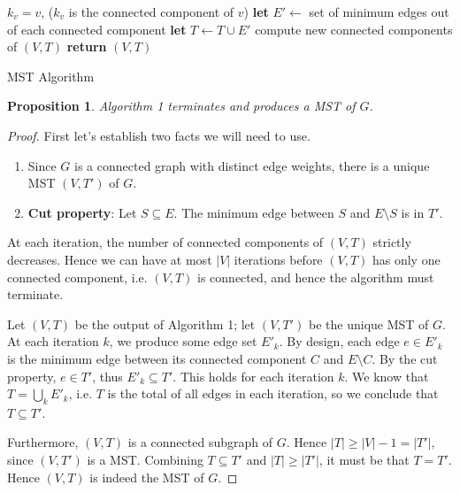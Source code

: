 \documentclass[10pt]{article}
\newtheorem{proposition}[lemma]{Proposition}
\begin{document}
\begin{enumerate}
  \begin{algorithm}[htb]
  \begin{algorithmic}
      \STATE \(k_v = v\), (\(k_v\) is the connected component of \(v\))
    \ENDFOR
      \STATE \textbf{let} \(E' \gets\) set of minimum edges out of each connected component
      \STATE \textbf{let} \(T \gets T \cup E'\)
      \STATE compute new connected components of \((V, T)\) 
     \ENDWHILE
    \STATE \textbf{return} \((V, T)\)
  \end{algorithmic}
\caption{MST Algorithm \label{alg:mst}}
\end{algorithm}

\begin{proposition}
  Algorithm 1 terminates and produces a MST of \(G\).
\end{proposition}
\begin{proof}
  First let's establish two facts we will need to use. 
  \begin{enumerate}
    \item Since \(G\) is a connected graph with distinct edge weights, there is a unique MST \((V, T')\) of \(G\). 
    \item \textbf{Cut property}: Let \(S \subseteq E\). The minimum edge between \(S\) and \(E \setminus S\) is in \(T'\).
  \end{enumerate} 

  At each iteration, the number of connected components of \((V, T)\) strictly decreases. Hence we can have at most \(|V|\) iterations before \((V, T)\) has only one connected component, i.e. \((V, T)\) is connected, and hence the algorithm must terminate. 
  
  Let \((V, T)\) be the output of Algorithm 1; let \((V, T')\) be the unique MST of \(G\). At each iteration \(k\), we produce some edge set \(E'_k\). By design, each edge \(e \in E'_k\) is the minimum edge between its connected component \(C\) and \(E \setminus C\). By the cut property, \(e \in T'\), thus \(E'_k \subseteq T'\). This holds for each iteration \(k\). We know that \(T = \bigcup_{k} E'_k\), i.e. \(T\) is the total of all edges in each iteration, so we conclude that \(T \subseteq T'\). 

  Furthermore, \((V, T)\) is a connected subgraph of \(G\). Hence \(|T| \ge |V| - 1 = |T'|\), since \((V, T')\) is a MST. Combining \(T \subseteq T'\) and \(|T| \ge |T'|\), it must be that \(T = T'\). Hence \((V, T)\) is indeed the MST of \(G\). 
\end{proof}


\end{enumerate}
\end{document}
